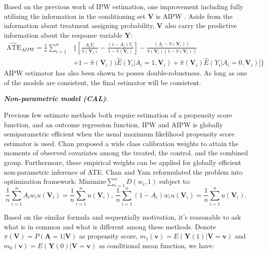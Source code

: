 \documentclass[11pt, oneside]{article}
\newcommand{\bA}{\mathbf{A}}
\newcommand{\bY}{\mathbf{Y}}
\newcommand{\bV}{\mathbf{V}}
\newcommand{\bv}{\mathbf{v}}
\begin{document}
Based on the previous work of IPW estimation, one improvement including fully utilizing the information in the conditioning set $\bV$ is AIPW \cite{Glynn2010}. Aside from the information about treatment assigning probability, $\bV$ also carry the predictive information about the response variable $\bY$:
\begin{align*}
\widehat{\mbox{ATE}}_{AIPW} = \frac{1}{n}\sum_{i=1}^n & \bigg\{\left[ \frac{A_iY_i}{\hat{\pi}(\bV_i)}-\frac{(1-A_i)Y_i}{1-\hat{\pi}(\bV_i)}\right]  - \frac{(A_i-\hat{\pi}(\bV_i))}{\hat{\pi}(\bV_i)(1-\hat{\pi}(\bV_i))} \\ & + 1-\hat{\pi}(\bV_i))\hat{E}(Y_i|A_i=1,\bV_i) +\hat{\pi}(\bV_i)\hat{E}(Y_i|A_i=0,\bV_i)]\bigg\}
\end{align*}
AIPW estimator has also been shown to posses double-robustness. As long as one of the models are consistent, the final estimator will be consistent.

\noindent
\textit{\textbf{Non-parametric model (CAL)}}:

Previous few estimate methods both require estimation of a propensity score function, and an outcome regression function, IPW and AIPW is globally semiparametric efficient when the usual maximum likelihood propensity score estimator is used. Chan \cite{Chan2016} proposed a wide class calibration weights to attain the moments of observed covariates among the treated, the control, and the combined group. Furthermore, these empirical weights can be applied for globally efficient non-parametric inference of ATE. Chan and Yam reformulated the problem into optimization framework: $\mbox{Minimize} \sum_{i=1}^nD(w_i,1)$ subject to:
$$\frac{1}{n}\sum_{i=1}^n A_i w_i u(\bV_i)=\frac{1}{n}\sum_{i=1}^n u(\bV_i),\ \frac{1}{n}\sum_{i=1}^n (1-A_i) w_i u(\bV_i)=\frac{1}{n}\sum_{i=1}^n u(\bV_i).$$

Based on the similar formula and sequentially motivation, it's reasonable to ask what is in common and what is different among these methods. Denote $\pi(\bV)=P(\bA=1|\bV)$ as propensity score, $m_1(\bv)=E(\bY(1) | \bV=\bv)$ and $m_0(\bv)=E(\bY(0) | \bV=\bv)$ as conditional mean function, we have:
\end{document}
